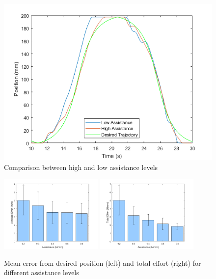\documentclass[12pt]{report}
\begin{document}
	
\begin{figure}[h] 
	\centering
	\includegraphics[width=0.9\linewidth]{position_comp}
	\caption{Comparison between high and low assistance levels}
	\label{fig:pos_comp}
\end{figure}

	
\begin{figure}[h]
	\centering
	\includegraphics[width=0.45\textwidth]{err_assist}
	\includegraphics[width=0.45\textwidth]{eff_assist}
	\caption{Mean error from desired position (left) and total effort (right) for different assistance levels}
	\label{fig:assist}
\end{figure}	
		
\end{document}
